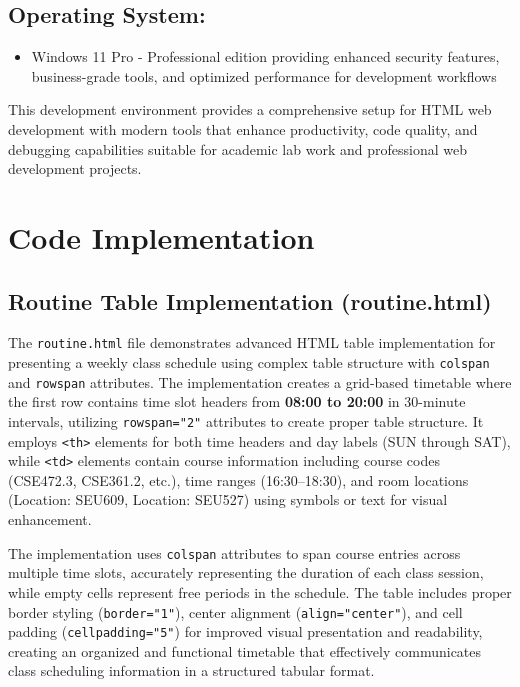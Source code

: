 \documentclass[twoside]{article}
\begin{document}
\subsection*{Operating System:}
\begin{itemize}
    \item Windows 11 Pro - Professional edition providing enhanced security features, business-grade tools, and optimized performance for development workflows
\end{itemize}

This development environment provides a comprehensive setup for HTML web development with modern tools that enhance productivity, code quality, and debugging capabilities suitable for academic lab work and professional web development projects.


\section{Code Implementation}

\subsection{Routine Table Implementation (routine.html)}
The \texttt{routine.html} file demonstrates advanced HTML table implementation for presenting a weekly class schedule using complex table structure with \texttt{colspan} and \texttt{rowspan} attributes. The implementation creates a grid-based timetable where the first row contains time slot headers from \textbf{08:00 to 20:00} in 30-minute intervals, utilizing \texttt{rowspan="2"} attributes to create proper table structure. It employs \texttt{<th>} elements for both time headers and day labels (SUN through SAT), while \texttt{<td>} elements contain course information including course codes (CSE472.3, CSE361.2, etc.), time ranges (16:30--18:30), and room locations (Location: SEU609, Location: SEU527) using symbols or text for visual enhancement.

The implementation uses \texttt{colspan} attributes to span course entries across multiple time slots, accurately representing the duration of each class session, while empty cells represent free periods in the schedule. The table includes proper border styling (\texttt{border="1"}), center alignment (\texttt{align="center"}), and cell padding (\texttt{cellpadding="5"}) for improved visual presentation and readability, creating an organized and functional timetable that effectively communicates class scheduling information in a structured tabular format.
\end{document}
